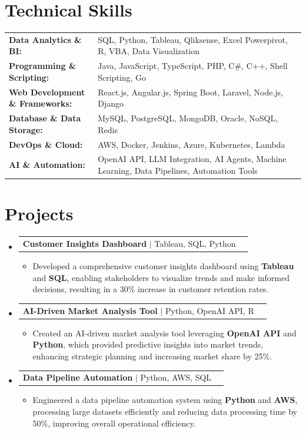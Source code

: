 \documentclass[letterpaper,10pt]{article}
\makeatletter
\newcommand{\resumeItem}[1]{
  \item{\fontsize{8pt}{9pt}\selectfont
    #1 \vspace{-3pt}
  }
}
\newcommand{\resumeProjectHeading}[2]{
    \item
    \begin{tabular*}{1.001\textwidth}{l@{\extracolsep{\fill}}r}
      \fontsize{8.5pt}{10pt}#1 & \textbf{\fontsize{8.5pt}{10pt} #2}\\
    \end{tabular*}\vspace{-7pt}
}
\newcommand{\resumeSubHeadingListStart}{\begin{itemize}[leftmargin=0pt, label={}]}
\newcommand{\resumeSubHeadingListEnd}{\end{itemize}}
\newcommand{\resumeItemListStart}{\begin{itemize}[leftmargin=*]}
\newcommand{\resumeItemListEnd}{\end{itemize}\vspace{-5pt}}
\makeatother
\begin{document}
\section{Technical Skills}
        \vspace{-14pt}
        \begin{table}[h]
            \fontsize{8pt}{9pt}\selectfont
            \begin{tabular}{p{0.3\linewidth} p{0.7\linewidth}}
                \textbf{Data Analytics \& BI:} & SQL, Python, Tableau, Qliksense, Excel Powerpivot, R, VBA, Data Visualization \\
                \textbf{Programming \& Scripting:} & Java, JavaScript, TypeScript, PHP, C\#, C++, Shell Scripting, Go \\
                \textbf{Web Development \& Frameworks:} & React.js, Angular.js, Spring Boot, Laravel, Node.js, Django \\
                \textbf{Database \& Data Storage:} & MySQL, PostgreSQL, MongoDB, Oracle, NoSQL, Redis \\
                \textbf{DevOps \& Cloud:} & AWS, Docker, Jenkins, Azure, Kubernetes, Lambda \\
                \textbf{AI \& Automation:} & OpenAI API, LLM Integration, AI Agents, Machine Learning, Data Pipelines, Automation Tools \\
            \end{tabular}
        \end{table}
 \vspace{-18pt}

\section{Projects}
    \vspace{-5pt}
    \resumeSubHeadingListStart
          \resumeProjectHeading
            {\textbf{Customer Insights Dashboard} $|$ Tableau, SQL, Python}{}
            \resumeItemListStart
                \resumeItem{Developed a comprehensive customer insights dashboard using \textbf{Tableau} and \textbf{SQL}, enabling stakeholders to visualize trends and make informed decisions, resulting in a 30\% increase in customer retention rates.}
            \resumeItemListEnd
        \vspace{-12pt}
    
        \resumeProjectHeading
            {\textbf{AI-Driven Market Analysis Tool} $|$ Python, OpenAI API, R}{}
        \resumeItemListStart
                \resumeItem{Created an AI-driven market analysis tool leveraging \textbf{OpenAI API} and \textbf{Python}, which provided predictive insights into market trends, enhancing strategic planning and increasing market share by 25\%.}
        \resumeItemListEnd
      \vspace{-12pt}
      \resumeProjectHeading
        {\textbf{Data Pipeline Automation} $|$ Python, AWS, SQL}{}
    \resumeItemListStart
            \resumeItem{Engineered a data pipeline automation system using \textbf{Python} and \textbf{AWS}, processing large datasets efficiently and reducing data processing time by 50\%, improving overall operational efficiency.}
    \resumeItemListEnd
    \resumeSubHeadingListEnd
\end{document}
